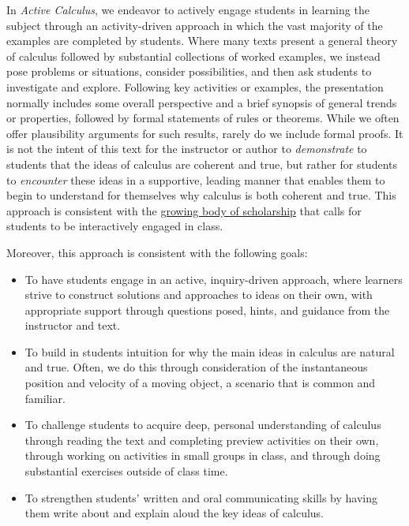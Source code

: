 In \emph{Active Calculus}, we endeavor to actively engage students in learning the subject through an activity-driven approach in which the vast majority of the examples are completed by students.  Where many texts present a general theory of calculus followed by substantial collections of worked examples, we instead pose problems or situations, consider possibilities, and then ask students to investigate and explore.  Following key activities or examples, the presentation normally includes some overall perspective and a brief synopsis of general trends or properties, followed by formal statements of rules or theorems.  While we often offer plausibility arguments for such results, rarely do we include formal proofs.  It is not the intent of this text for the instructor or author to \emph{demonstrate} to students that the ideas of calculus are coherent and true, but rather for students to \emph{encounter} these ideas in a supportive, leading manner that enables them to begin to understand for themselves why calculus is both coherent and true.  This approach is consistent with the \href{http://launchings.blogspot.com/2011/07/the-worst-way-to-teach.html}{growing body of scholarship} that calls for students to be interactively engaged in class.

\newpage

Moreover, this approach is consistent with the following goals:

\begin{itemize}
   \item To have students engage in an active, inquiry-driven approach, where learners strive to construct solutions and approaches to ideas on their own, with appropriate support through questions posed, hints, and guidance from the instructor and text.
   \item To build in students intuition for why the main ideas in calculus are natural and true.  Often, we do this through consideration of the instantaneous position and velocity of a moving object, a scenario that is common and familiar.
   \item To challenge students to acquire deep, personal understanding of calculus through reading the text and completing preview activities on their own, through working on activities in small groups in class, and through doing substantial exercises outside of class time.  
   \item To strengthen students' written and oral communicating skills by having them write about and explain aloud the key ideas of calculus.
\end{itemize}

